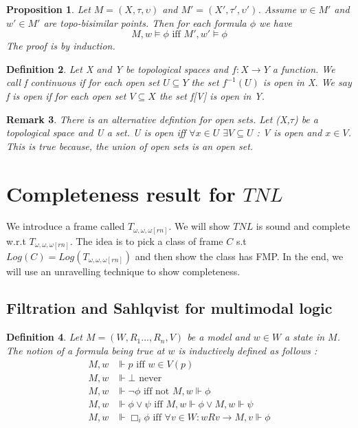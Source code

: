 \documentclass[12pt, a4paper]{scrartcl}
\newtheorem{definition}{Definition}[subsection]
\newtheorem{proposition}[definition]{Proposition}
\newtheorem{remark}[definition]{Remark}
\begin{document}
\begin{proposition}
    Let $M = (X,\tau, \upsilon)$ and $M' = (X', \tau', \upsilon')$. Assume $w \in M'$ and $w' \in M'$ are topo-bisimilar points.
    Then for each formula $\phi$ we have 
    $$M,w \vDash \phi \mbox{ iff } M', w' \vDash \phi$$
    The proof is by induction.

\end{proposition}


\begin{definition}
    Let X and Y be topological spaces and $f : X \rightarrow Y$ a function.
    We call f continuous if for each open set $U \subseteq Y$ the set $f^{-1}(U)$ is open in X. We say f 
    is open if for each open set $V \subseteq X$ the set f[V] is open in Y.
        
\end{definition}

\begin{remark}

    There is an alternative defintion for open sets. Let (X,$\tau$) be a topological space and U a set.
    U is open iff $\forall x \in U$  $\exists V\subseteq U$ : V is open and $x \in V$. This is true because,
    the union of open sets is an open set.
    
\end{remark}


\section{Completeness result for $TNL$}

We introduce a frame called $T_{\omega, \omega, \omega[rn]}$. We will show $TNL$ is sound and complete w.r.t $T_{\omega, \omega, \omega[rn]}$.
The idea is to pick a class of frame $C$ s.t $Log(C) = Log(T_{\omega, \omega, \omega[rn]})$ and then show the class has FMP.
In the end, we will use an unravelling technique to show completeness. 

\subsection{Filtration and Sahlqvist for multimodal logic}

\begin{definition}
    Let $M = (W,R_1...,R_n,V)$ be a model and $w \in W$ a state in $M$. The notion of a formula being true at $w$ is inductively defined as follows :
    \begin{align*}
        M, w &\Vdash p \mbox{ iff } w \in V(p) \\
        M, w &\Vdash \bot  \mbox{ never } \\
        M, w &\Vdash \neg \phi \mbox{ iff not } M, w \Vdash \phi \\ 
        M, w &\Vdash \phi \lor \psi \mbox{ iff } M,w \Vdash \phi \lor M,w \Vdash \psi \\
        M, w &\Vdash \Box_i \phi \mbox{ iff } \forall v \in W : wRv \rightarrow M, v \Vdash \phi
    \end{align*}

\end{definition}
\end{document}
